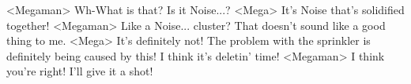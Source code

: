 <Megaman> Wh-What is that? Is it Noise...? 
<Mega> It's Noise that's solidified together! 
<Megaman> Like a Noise... cluster? 
That doesn't sound like a good thing to me. 
<Mega> It's definitely not! 
The problem with the sprinkler is definitely being caused by this! 
I think it's deletin' time! 
<Megaman> I think you're right! 
I'll give it a shot! 
